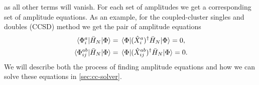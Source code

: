             as all other terms will vanish.
            For each set of amplitudes we get a corresponding set of amplitude
            equations.
            As an example, for the coupled-cluster singles and doubles (CCSD)
            method we get the pair of amplitude equations
            \begin{gather}
                \mel*{\Phi^{a}_{i}}{
                    \bar{H}_N
                }{\Phi}
                =
                \mel*{\Phi}{
                    (\hat{X}^{a}_{i})^{\dagger}
                    \bar{H}_N
                }{\Phi}
                = 0,
                \\
                \mel*{\Phi^{ab}_{ij}}{
                    \bar{H}_N
                }{\Phi}
                =
                \mel*{\Phi}{
                    (\hat{X}^{ab}_{ij})^{\dagger}
                    \bar{H}_N
                }{\Phi}
                = 0.
            \end{gather}
            We will describe both the process of finding amplitude equations and
            how we can solve these equations in \autoref{sec:cc-solver}.



